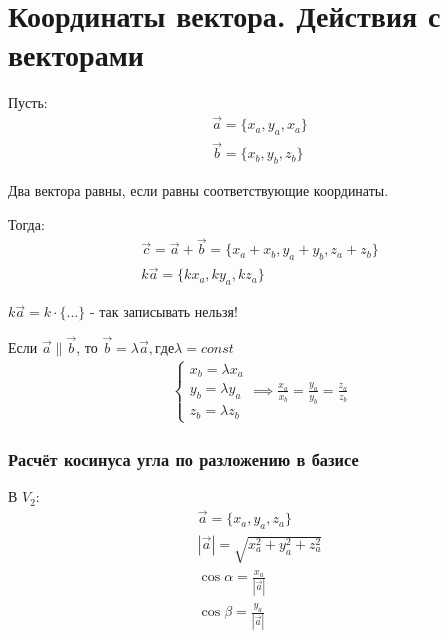 \section{Координаты вектора. Действия с векторами}

Пусть:
\begin{gather*}
  \vec{a} = \{x_a, y_a, x_a\} \\
  \vec{b} = \{x_b, y_b, z_b \}
\end{gather*}

\begin{note}
  Два вектора равны, если равны соответствующие координаты.
\end{note}

Тогда:
\begin{gather*}
  \vec{c} = \vec{a} + \vec{b} = \{x_a + x_b, y_a + y_b, z_a + z_b\} \\ 
  k \vec{a} = \{k x_a, k y_a, k z_a\} 
\end{gather*}
\begin{note}
  $k \vec{a} = k \cdot \{ \ldots \} $ - так записывать нельзя!
\end{note}

Если $\vec{a} \parallel \vec{b}$, то $\vec{b} = \lambda \vec{a}, где \lambda = const$
\begin{gather*}
  \begin{cases}
    x_b = \lambda x_a \\
    y_b = \lambda y_a \\
    z_b = \lambda z_b
  \end{cases}
  \implies 
  \frac{x_a}{x_b} = \frac{y_a}{y_b} = \frac{z_a}{z_b}
\end{gather*}

\subsubsection*{Расчёт косинуса угла по разложению в базисе}

\begin{eg}
  В $V_2$:
  \begin{gather*}
    \vec{a} = \{x_a, y_a, z_a\} \\
    |\vec{a}| = \sqrt{x_a^2 + y_a^2 + z_a^2} \\
    \cos \alpha = \frac{x_a}{|\vec{a}|} \\
    \cos \beta = \frac{y_a}{|\vec{a}|}
  \end{gather*}
\end{eg}

